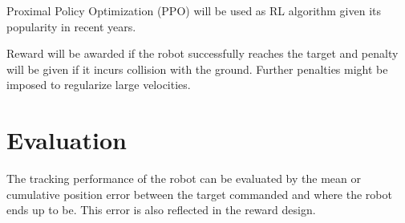 \documentclass{article}
\begin{document}
Proximal Policy Optimization (PPO) will be used as RL algorithm given its popularity in recent years.

Reward will be awarded if the robot successfully reaches the target and penalty will be given if it incurs collision with the ground. Further penalties might be imposed to regularize large velocities.


\section{Evaluation}
The tracking performance of the robot can be evaluated by the mean or cumulative position error between the target commanded and where the robot ends up to be. This error is also reflected in the reward design.


\medskip


\end{document}
